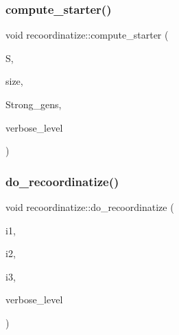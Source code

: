 \mbox{\label{classrecoordinatize_a274b399821488e5f6fb1adfbc8f8ebac}} 
\subsubsection{\texorpdfstring{compute\+\_\+starter()}{compute\_starter()}}
{\footnotesize\ttfamily void recoordinatize\+::compute\+\_\+starter (\begin{DoxyParamCaption}\item[{\mbox{\hyperlink{galois_8h_a09fddde158a3a20bd2dcadb609de11dc}{I\+NT}} $\ast$\&}]{S,  }\item[{\mbox{\hyperlink{galois_8h_a09fddde158a3a20bd2dcadb609de11dc}{I\+NT}} \&}]{size,  }\item[{\mbox{\hyperlink{classstrong__generators}{strong\+\_\+generators}} $\ast$\&}]{Strong\+\_\+gens,  }\item[{\mbox{\hyperlink{galois_8h_a09fddde158a3a20bd2dcadb609de11dc}{I\+NT}}}]{verbose\+\_\+level }\end{DoxyParamCaption})}

\mbox{\label{classrecoordinatize_ae667d36625d30c780af10da96e26ab04}} 
\subsubsection{\texorpdfstring{do\+\_\+recoordinatize()}{do\_recoordinatize()}}
{\footnotesize\ttfamily void recoordinatize\+::do\+\_\+recoordinatize (\begin{DoxyParamCaption}\item[{\mbox{\hyperlink{galois_8h_a09fddde158a3a20bd2dcadb609de11dc}{I\+NT}}}]{i1,  }\item[{\mbox{\hyperlink{galois_8h_a09fddde158a3a20bd2dcadb609de11dc}{I\+NT}}}]{i2,  }\item[{\mbox{\hyperlink{galois_8h_a09fddde158a3a20bd2dcadb609de11dc}{I\+NT}}}]{i3,  }\item[{\mbox{\hyperlink{galois_8h_a09fddde158a3a20bd2dcadb609de11dc}{I\+NT}}}]{verbose\+\_\+level }\end{DoxyParamCaption})}

